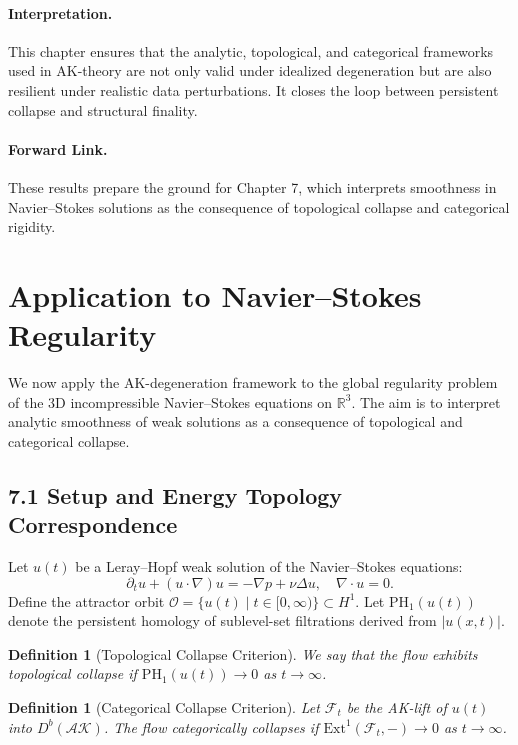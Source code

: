 \documentclass[11pt]{article}
\newtheorem{definition}[theorem]{Definition}
\begin{document}
\paragraph{Interpretation.} 
This chapter ensures that the analytic, topological, and categorical frameworks used in AK-theory are not only valid under idealized degeneration but are also resilient under realistic data perturbations. It closes the loop between persistent collapse and structural finality.

\paragraph{Forward Link.}
These results prepare the ground for Chapter 7, which interprets smoothness in Navier–Stokes solutions as the consequence of topological collapse and categorical rigidity.



\section{Application to Navier--Stokes Regularity}

We now apply the AK-degeneration framework to the global regularity problem of the 3D incompressible Navier--Stokes equations on $\mathbb{R}^3$. The aim is to interpret analytic smoothness of weak solutions as a consequence of topological and categorical collapse.

\subsection{7.1 Setup and Energy Topology Correspondence}

Let $u(t)$ be a Leray–Hopf weak solution of the Navier--Stokes equations:
\[
\partial_t u + (u \cdot \nabla) u = -\nabla p + \nu \Delta u, \quad \nabla \cdot u = 0.
\]
Define the attractor orbit $\mathcal{O} = \{ u(t) \mid t \in [0, \infty) \} \subset H^1$. Let $\mathrm{PH}_1(u(t))$ denote the persistent homology of sublevel-set filtrations derived from $|u(x,t)|$.

\begin{definition}[Topological Collapse Criterion]
We say that the flow exhibits topological collapse if $\mathrm{PH}_1(u(t)) \to 0$ as $t \to \infty$.
\end{definition}

\begin{definition}[Categorical Collapse Criterion]
Let $\mathcal{F}_t$ be the AK-lift of $u(t)$ into $D^b(\mathcal{AK})$. The flow categorically collapses if $\mathrm{Ext}^1(\mathcal{F}_t, -) \to 0$ as $t \to \infty$.
\end{definition}
\end{document}
